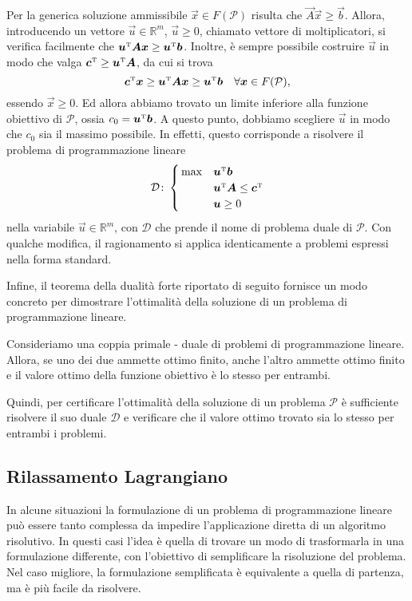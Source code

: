 Per la generica soluzione ammissibile $\vec{x} \in F(\mathcal{P})$ risulta
che $\vec{A}\vec{x} \ge \vec{b}$. Allora, introducendo un vettore $\vec{u}
\in \mathbb{R}^m$, $\vec{u} \ge 0$, chiamato vettore  di moltiplicatori, si
verifica facilmente che $\bm{u}^{\scriptscriptstyle\mathrm{T}} \bm{A} \bm{x} \ge \bm{u}^{\scriptscriptstyle\mathrm{T}}\bm{b}$.
Inoltre, è sempre possibile costruire $\vec{u}$ in modo che valga
$\bm{c}^{\scriptscriptstyle\mathrm{T}} \ge \bm{u}^{\scriptscriptstyle\mathrm{T}} \bm{A}$, da cui si trova
\begin{equation}\label{eq:weak_duality}
    \bm{c}^{\scriptscriptstyle\mathrm{T}} \bm{x} \ge \bm{u}^{\scriptscriptstyle\mathrm{T}} \bm{A} \bm{x} \ge \bm{u}^{\scriptscriptstyle\mathrm{T}}\bm{b}
    \quad \forall \bm{x} \in F(\mathcal{P}),
\end{equation}
essendo $\vec{x} \ge 0$. Ed allora abbiamo trovato un limite inferiore alla
funzione obiettivo di $\mathcal{P}$, ossia $c_{0} = \bm{u}^{\scriptscriptstyle\mathrm{T}} \bm{b}$. A
questo punto, dobbiamo scegliere $\vec{u}$ in modo che $c_{0}$ sia il
massimo possibile. In effetti, questo corrisponde a risolvere il problema
di programmazione lineare
\begin{equation}
    \mathcal{D}\colon
    \begin{cases}
        \,\max & \bm{u}^{\scriptscriptstyle\mathrm{T}} \bm{b} \\
               & \bm{u}^{\scriptscriptstyle\mathrm{T}}\bm{A} \le \bm{c}^{\scriptscriptstyle\mathrm{T}} \\
             & \bm{u} \ge 0
    \end{cases}
\end{equation}
nella variabile $\vec{u} \in \mathbb{R}^m$, con $\mathcal{D}$ che prende il
nome di problema duale di $\mathcal{P}$. Con qualche modifica, il
ragionamento si applica identicamente a problemi espressi nella forma
standard.

Infine, il teorema della dualità forte riportato di seguito fornisce un
modo concreto per dimostrare l'ottimalità della soluzione di un problema
di programmazione lineare.
\begin{theorem}
    Consideriamo una coppia primale - duale di problemi di programmazione
    lineare. Allora, se uno dei due ammette ottimo finito, anche l'altro
    ammette ottimo finito e il valore ottimo della funzione obiettivo è lo
    stesso per entrambi.
\end{theorem}
Quindi, per certificare l'ottimalità della soluzione di un problema
$\mathcal{P}$ è sufficiente risolvere il suo duale $\mathcal{D}$ e
verificare che il valore ottimo trovato sia lo stesso per entrambi i
problemi.

\subsection{Rilassamento Lagrangiano}
In alcune situazioni la formulazione di un problema di programmazione
lineare può essere tanto complessa da impedire l'applicazione diretta di un
algoritmo risolutivo. In questi casi l'idea è quella di trovare un modo di
trasformarla in una formulazione differente, con l'obiettivo di
semplificare la risoluzione del problema. Nel caso migliore, la
formulazione semplificata è equivalente a quella di partenza, ma è più
facile da risolvere.

